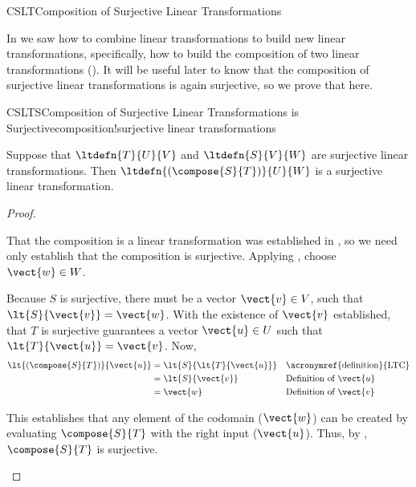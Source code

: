 %
\begin{subsect}{CSLT}{Composition of Surjective Linear Transformations}
%
\begin{para}In  we saw how to combine linear transformations to build new linear transformations, specifically, how to build the composition of two linear transformations ().  It will be useful later to know that the composition of surjective linear transformations is again surjective, so we prove that here.\end{para}
%
\begin{theorem}{CSLTS}{Composition of Surjective Linear Transformations is Surjective}{composition!surjective linear transformations}
\begin{para}Suppose that $\ltdefn{T}{U}{V}$ and $\ltdefn{S}{V}{W}$ are surjective linear transformations.  Then $\ltdefn{(\compose{S}{T})}{U}{W}$ is a surjective linear transformation.\end{para}
\end{theorem}
%
\begin{proof}
\begin{para}That the composition is a linear transformation was established in , so we need only establish that the composition is surjective.  Applying , choose $\vect{w}\in W$.\end{para}
%
\begin{para}Because $S$ is surjective, there must be a vector $\vect{v}\in V$, such that $\lt{S}{\vect{v}}=\vect{w}$.  With the existence of $\vect{v}$ established, that $T$ is surjective guarantees a vector $\vect{u}\in U$ such that $\lt{T}{\vect{u}}=\vect{v}$.  Now,
%
\begin{align*}
\lt{\left(\compose{S}{T}\right)}{\vect{u}}&=\lt{S}{\lt{T}{\vect{u}}}&&\text{\acronymref{definition}{LTC}}\\
&=\lt{S}{\vect{v}}&&\text{Definition of $\vect{u}$}\\
&=\vect{w}&&\text{Definition of $\vect{v}$}
\end{align*}
\end{para}
%
\begin{para}This establishes that any element of the codomain ($\vect{w}$) can be created by evaluating $\compose{S}{T}$ with the right input ($\vect{u}$).  Thus, by , $\compose{S}{T}$ is surjective.\end{para}
%
\end{proof}
%
%
\end{subsect}
%
